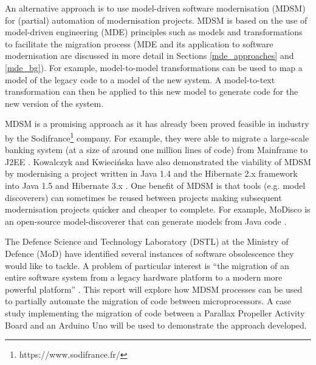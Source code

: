 \documentclass{UoYCSproject}
\begin{document}
An alternative approach is to use model-driven software modernisation (MDSM) for (partial) automation of modernisation projects. MDSM is based on the use of model-driven engineering (MDE) principles such as models and transformations to facilitate the migration process (MDE and its application to software modernisation are discussed in more detail in Sections \ref{mde_approaches} and \ref{mde_bg}). For example, model-to-model transformations can be used to map a model of the legacy code to a model of the new system. A model-to-text transformation can then be applied to this new model to generate code for the new version of the system.

MDSM is a promising approach as it has already been proved feasible in industry by the Sodifrance\footnote{https://www.sodifrance.fr/} company. For example, they were able to migrate a large-scale banking system (at a size of around one million lines of code) from Mainframe to J2EE \parencite{fleurey2007model}. Kowalczyk and Kwieci\'nska have also demonstrated the viability of MDSM by modernising a project written in Java 1.4 and the Hibernate 2.x framework into Java 1.5 and Hibernate 3.x \parencite{kowalczyk2009model}. One benefit of MDSM is that tools (e.g. model discoverers) can sometimes be reused between projects making subsequent modernisation projects quicker and cheaper to complete. For example, MoDisco is an open-source model-discoverer that can generate models from Java code \parencite{bruneliere2014modisco}.

The Defence Science and Technology Laboratory (DSTL) at the Ministry of Defence (MoD) have identified several instances of software obsolescence they would like to tackle. A problem of particular interest is ``the migration of an entire software system from a legacy hardware platform to a modern more powerful platform'' \parencite{gerasimou2017technical}. This report will explore how MDSM processes can be used to partially automate the migration of code between microprocessors. A case study implementing the migration of code between a Parallax Propeller Activity Board and an Arduino Uno will be used to demonstrate the approach developed.
 
\end{document}
